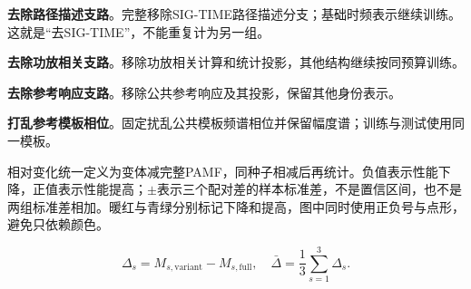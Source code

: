 \documentclass[10pt,journal]{IEEEtran}
\begin{document}
\noindent\textbf{去除路径描述支路}。完整移除SIG-TIME路径描述分支；基础时频表示继续训练。这就是“去SIG-TIME”，不能重复计为另一组。\par

\noindent\textbf{去除功放相关支路}。移除功放相关计算和统计投影，其他结构继续按同预算训练。\par

\noindent\textbf{去除参考响应支路}。移除公共参考响应及其投影，保留其他身份表示。\par

\noindent\textbf{打乱参考模板相位}。固定扰乱公共模板频谱相位并保留幅度谱；训练与测试使用同一模板。\par

相对变化统一定义为变体减完整PAMF，同种子相减后再统计。负值表示性能下降，正值表示性能提高；\ensuremath{\pm}表示三个配对差的样本标准差，不是置信区间，也不是两组标准差相加。暖红与青绿分别标记下降和提高，图中同时使用正负号与点形，避免只依赖颜色。

\begin{equation}\Delta_{s}=M_{s,\mathrm{variant}}-M_{s,\mathrm{full}},\quad \bar\Delta=\frac{1}{3}\sum_{s=1}^{3}\Delta_s.\end{equation}
\end{document}
